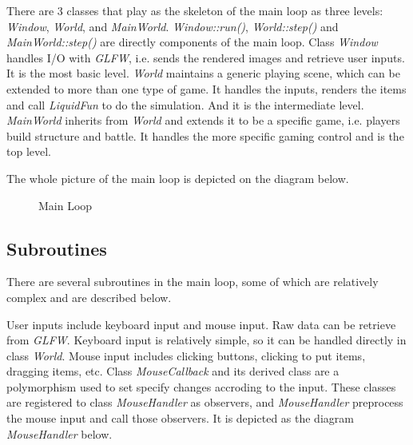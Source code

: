 \documentclass[UTF8]{ctexart}
\begin{document}
            There are 3 classes that play as the skeleton of the main loop as three levels: \textit{Window}, \textit{World}, and \textit{MainWorld}. \textit{Window::run()}, \textit{World::step()} and \textit{MainWorld::step()} are directly components of the main loop. Class \textit{Window} handles I/O with \textit{GLFW}, i.e. sends the rendered images and retrieve user inputs. It is the most basic level. \textit{World} maintains a generic playing scene, which can be extended to more than one type of game. It handles the inputs, renders the items and call \textit{LiquidFun} to do the simulation. And it is the intermediate level. \textit{MainWorld} inherits from \textit{World} and extends it to be a specific game, i.e. players build structure and battle. It handles the more specific gaming control and is the top level.

            The whole picture of the main loop is depicted on the diagram below. 

            \begin{figure}[htp]
                \caption{Main Loop}
            \end{figure}

        \subsection{Subroutines}

            There are several subroutines in the main loop, some of which are relatively complex and are described below.

            User inputs include keyboard input and mouse input. Raw data can be retrieve from \textit{GLFW}. Keyboard input is relatively simple, so it can be handled directly in class \textit{World}. Mouse input includes clicking buttons, clicking to put items, dragging items, etc. Class \textit{MouseCallback} and its derived class are a polymorphism used to set specify changes accroding to the input. These classes are registered to class \textit{MouseHandler} as observers, and \textit{MouseHandler} preprocess the mouse input and call those observers. It is depicted as the diagram \textit{MouseHandler} below.
\end{document}
